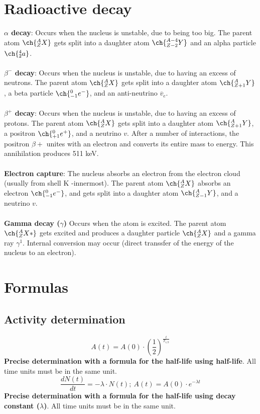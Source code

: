 \chapter{Radioactive decay}
\textbf{$\alpha$ decay}: Occurs when the nucleus is unstable, due to being too big. The parent atom $\ch{^{A}_{Z}X}$ gets split into a daughter atom $\ch{^{A-4}_{Z-2}Y}$ and an alpha particle $\ch{^{4}_{2}a}$.\\\\
\textbf{$\beta^{-}$ decay}: Occurs when the nucleus is unstable, due to having an excess of neutrons. The parent atom $\ch{^{A}_{Z}X}$ gets split into a daughter atom $\ch{^{A}_{Z+1}Y}$, a beta particle $\ch{^{0}_{-1}e^{-}}$, and an anti-neutrino $\overline{v}_e$.\\\\
\textbf{$\beta^{+}$ decay}: Occurs when the nucleus is unstable, due to having an excess of protons. The parent atom $\ch{^{A}_{Z}X}$ gets split into a daughter atom $\ch{^{A}_{Z+1}Y}$, a positron $\ch{^{0}_{+1}e^{+}}$, and a neutrino $v$. After a number of interactions, the positron $\beta{+}$ unites with an electron and converts its entire mass to energy. This annihilation produces 511 keV.\\\\
\textbf{Electron capture}: The nucleus absorbs an electron from the electron cloud (usually from shell K -innermost). The parent atom $\ch{^{A}_{Z}X}$ absorbs an electron $\ch{^{0}_{-1}e^{-}}$, and gets split into a daughter atom $\ch{^{A}_{Z-1}Y}$, and a neutrino $v$.\\\\
\textbf{Gamma decay ($\gamma$)} Occurs when the atom is excited. The parent atom $\ch{^{A}_{Z}X*}$ gets excited and produces a daughter particle $\ch{^{A}_{Z}X}$ and a gamma ray $\gamma^{1}$. Internal conversion may occur (direct transsfer of the energy of the nucleus to an electron).
\chapter{Formulas}
\section{Activity determination}
\[A(t) = A(0) \cdot (\frac{1}{2})^{\frac{t}{T_{1/2}}}\]
\textbf{Precise determination with a formula for the half-life using half-life}. All time units must be in the same unit.\\
\[\frac{dN(t)}{dt}=-\lambda\cdot N(t);\ A(t) = A(0)\cdot e^{-\lambda t}\]
\textbf{Precise determination with a formula for the half-life using decay constant ($\lambda$)}. All time units must be in the same unit.\\

